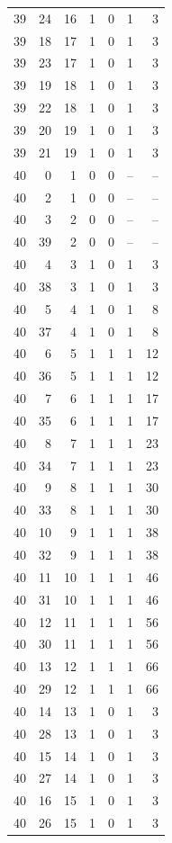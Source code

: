 \begin{longtable}{rrrrrrr}
39 & 24 & 16 & 1 & 0 & 1 & 3\\
39 & 18 & 17 & 1 & 0 & 1 & 3\\
39 & 23 & 17 & 1 & 0 & 1 & 3\\
39 & 19 & 18 & 1 & 0 & 1 & 3\\
39 & 22 & 18 & 1 & 0 & 1 & 3\\
39 & 20 & 19 & 1 & 0 & 1 & 3\\
39 & 21 & 19 & 1 & 0 & 1 & 3\\
40 & 0 & 1 & 0 & 0 & -- & --\\
40 & 2 & 1 & 0 & 0 & -- & --\\
40 & 3 & 2 & 0 & 0 & -- & --\\
40 & 39 & 2 & 0 & 0 & -- & --\\
40 & 4 & 3 & 1 & 0 & 1 & 3\\
40 & 38 & 3 & 1 & 0 & 1 & 3\\
40 & 5 & 4 & 1 & 0 & 1 & 8\\
40 & 37 & 4 & 1 & 0 & 1 & 8\\
40 & 6 & 5 & 1 & 1 & 1 & 12\\
40 & 36 & 5 & 1 & 1 & 1 & 12\\
40 & 7 & 6 & 1 & 1 & 1 & 17\\
40 & 35 & 6 & 1 & 1 & 1 & 17\\
40 & 8 & 7 & 1 & 1 & 1 & 23\\
40 & 34 & 7 & 1 & 1 & 1 & 23\\
40 & 9 & 8 & 1 & 1 & 1 & 30\\
40 & 33 & 8 & 1 & 1 & 1 & 30\\
40 & 10 & 9 & 1 & 1 & 1 & 38\\
40 & 32 & 9 & 1 & 1 & 1 & 38\\
40 & 11 & 10 & 1 & 1 & 1 & 46\\
40 & 31 & 10 & 1 & 1 & 1 & 46\\
40 & 12 & 11 & 1 & 1 & 1 & 56\\
40 & 30 & 11 & 1 & 1 & 1 & 56\\
40 & 13 & 12 & 1 & 1 & 1 & 66\\
40 & 29 & 12 & 1 & 1 & 1 & 66\\
40 & 14 & 13 & 1 & 0 & 1 & 3\\
40 & 28 & 13 & 1 & 0 & 1 & 3\\
40 & 15 & 14 & 1 & 0 & 1 & 3\\
40 & 27 & 14 & 1 & 0 & 1 & 3\\
40 & 16 & 15 & 1 & 0 & 1 & 3\\
40 & 26 & 15 & 1 & 0 & 1 & 3\\

\end{longtable}

